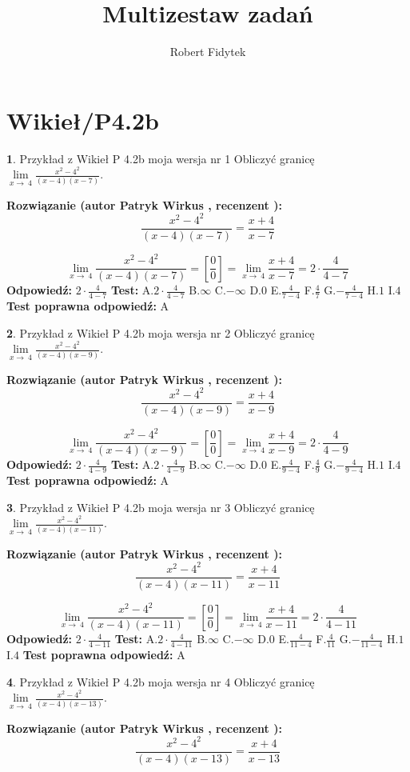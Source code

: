\documentclass[12pt, a4paper]{article}
\title{Multizestaw zadań}
\author{Robert Fidytek}
\date{}
\theoremstyle{definition} %
\newtheorem{zad}{}
\newcommand{\kategoria}[1]{\section{#1}}
\newcommand{\zadStart}[1]{\begin{zad}#1\newline}
\newcommand{\zadStop}{\end{zad}}
\newcommand{\rozwStart}[2]{\noindent \textbf{Rozwiązanie (autor #1 , recenzent #2): }\newline}
\newcommand{\rozwStop}{\newline}
\newcommand{\odpStart}{\noindent \textbf{Odpowiedź:}\newline}
\newcommand{\odpStop}{\newline}
\newcommand{\testStart}{\noindent \textbf{Test:}\newline}
\newcommand{\testStop}{\newline}
\newcommand{\kluczStart}{\noindent \textbf{Test poprawna odpowiedź:}\newline}
\newcommand{\kluczStop}{\newline}
\begin{document}
\maketitle

\kategoria{Wikieł/P4.2b}


\zadStart{Przykład z Wikieł P 4.2b moja wersja nr 1}
Obliczyć granicę $\lim\limits_{x\to\ 4}\frac{x^{2}-4^{2}}{(x-4)(x-7)}$.
\zadStop
\rozwStart{Patryk Wirkus}{}
$$\frac{x^{2}-4^{2}}{(x-4)(x-7)}=\frac{x+4}{x-7}$$

$$\lim\limits_{x\to\ 4}\frac{x^{2}-4^{2}}{(x-4)(x-7)}=[\frac{0}{0}]=\lim\limits_{x\to\ 4}\frac{x+4}{x-7}=2 \cdot \frac{4}{4-7}$$
\rozwStop
\odpStart
$2 \cdot \frac{4}{4-7}$
\odpStop
\testStart
A.$2 \cdot \frac{4}{4-7}$
B.$\infty$
C.$-\infty$
D.$0$
E.$\frac{4}{7-4}$
F.$\frac{4}{7}$
G.$-\frac{4}{7-4}$
H.$1$
I.$4$
\testStop
\kluczStart
A
\kluczStop



\zadStart{Przykład z Wikieł P 4.2b moja wersja nr 2}
Obliczyć granicę $\lim\limits_{x\to\ 4}\frac{x^{2}-4^{2}}{(x-4)(x-9)}$.
\zadStop
\rozwStart{Patryk Wirkus}{}
$$\frac{x^{2}-4^{2}}{(x-4)(x-9)}=\frac{x+4}{x-9}$$

$$\lim\limits_{x\to\ 4}\frac{x^{2}-4^{2}}{(x-4)(x-9)}=[\frac{0}{0}]=\lim\limits_{x\to\ 4}\frac{x+4}{x-9}=2 \cdot \frac{4}{4-9}$$
\rozwStop
\odpStart
$2 \cdot \frac{4}{4-9}$
\odpStop
\testStart
A.$2 \cdot \frac{4}{4-9}$
B.$\infty$
C.$-\infty$
D.$0$
E.$\frac{4}{9-4}$
F.$\frac{4}{9}$
G.$-\frac{4}{9-4}$
H.$1$
I.$4$
\testStop
\kluczStart
A
\kluczStop



\zadStart{Przykład z Wikieł P 4.2b moja wersja nr 3}
Obliczyć granicę $\lim\limits_{x\to\ 4}\frac{x^{2}-4^{2}}{(x-4)(x-11)}$.
\zadStop
\rozwStart{Patryk Wirkus}{}
$$\frac{x^{2}-4^{2}}{(x-4)(x-11)}=\frac{x+4}{x-11}$$

$$\lim\limits_{x\to\ 4}\frac{x^{2}-4^{2}}{(x-4)(x-11)}=[\frac{0}{0}]=\lim\limits_{x\to\ 4}\frac{x+4}{x-11}=2 \cdot \frac{4}{4-11}$$
\rozwStop
\odpStart
$2 \cdot \frac{4}{4-11}$
\odpStop
\testStart
A.$2 \cdot \frac{4}{4-11}$
B.$\infty$
C.$-\infty$
D.$0$
E.$\frac{4}{11-4}$
F.$\frac{4}{11}$
G.$-\frac{4}{11-4}$
H.$1$
I.$4$
\testStop
\kluczStart
A
\kluczStop



\zadStart{Przykład z Wikieł P 4.2b moja wersja nr 4}
Obliczyć granicę $\lim\limits_{x\to\ 4}\frac{x^{2}-4^{2}}{(x-4)(x-13)}$.
\zadStop
\rozwStart{Patryk Wirkus}{}
$$\frac{x^{2}-4^{2}}{(x-4)(x-13)}=\frac{x+4}{x-13}$$
\end{document}
